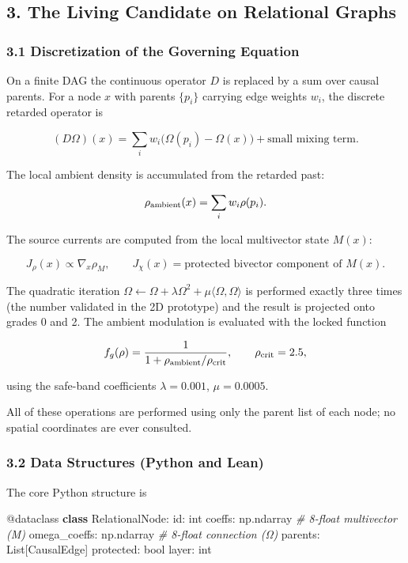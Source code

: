 \documentclass[
  11pt,
  a4paper,
]{article}
\newenvironment{Shaded}{\begin{snugshade}}{\end{snugshade}}
\newcommand{\AttributeTok}[1]{\textcolor[rgb]{0.13,0.29,0.53}{#1}}
\newcommand{\BuiltInTok}[1]{#1}
\newcommand{\CommentTok}[1]{\textcolor[rgb]{0.56,0.35,0.01}{\textit{#1}}}
\newcommand{\KeywordTok}[1]{\textcolor[rgb]{0.13,0.29,0.53}{\textbf{#1}}}
\newcommand{\NormalTok}[1]{#1}
\begin{document}
\subsection{3. The Living Candidate on Relational
Graphs}\label{the-living-candidate-on-relational-graphs}

\subsubsection{3.1 Discretization of the Governing
Equation}\label{discretization-of-the-governing-equation}

On a finite DAG the continuous operator \(D\) is replaced by a sum over
causal parents. For a node \(x\) with parents \(\{p_i\}\) carrying edge
weights \(w_i\), the discrete retarded operator is

\[
(D \Omega)(x) = \sum_i w_i \bigl( \Omega(p_i) - \Omega(x) \bigr) + \text{small mixing term}.
\]

The local ambient density is accumulated from the retarded past:

\[
\rho_{\rm ambient}(x) = \sum_i w_i \rho(p_i).
\]

The source currents are computed from the local multivector state
\(M(x)\):

\[
J_\rho(x) \propto \nabla_x \rho_M, \qquad J_\chi(x) = \text{protected bivector component of } M(x).
\]

The quadratic iteration
\(\Omega \leftarrow \Omega + \lambda \Omega^2 + \mu \langle \Omega, \Omega \rangle\)
is performed exactly three times (the number validated in the 2D
prototype) and the result is projected onto grades 0 and 2. The ambient
modulation is evaluated with the locked function

\[
f_g(\rho) = \frac{1}{1 + \rho_{\rm ambient}/\rho_{\rm crit}}, \qquad \rho_{\rm crit} = 2.5,
\]

using the safe-band coefficients \(\lambda = 0.001\), \(\mu = 0.0005\).

All of these operations are performed using only the parent list of each
node; no spatial coordinates are ever consulted.

\subsubsection{3.2 Data Structures (Python and
Lean)}\label{data-structures-python-and-lean}

The core Python structure is

\begin{Shaded}
\begin{Highlighting}[]
\AttributeTok{@dataclass}
\KeywordTok{class}\NormalTok{ RelationalNode:}
    \BuiltInTok{id}\NormalTok{: }\BuiltInTok{int}
\NormalTok{    coeffs: np.ndarray          }\CommentTok{\# 8{-}float multivector (M)}
\NormalTok{    omega\_coeffs: np.ndarray    }\CommentTok{\# 8{-}float connection (Ω)}
\NormalTok{    parents: List[CausalEdge]}
\NormalTok{    protected: }\BuiltInTok{bool}
\NormalTok{    layer: }\BuiltInTok{int}
\end{Highlighting}
\end{Shaded}
\end{document}
